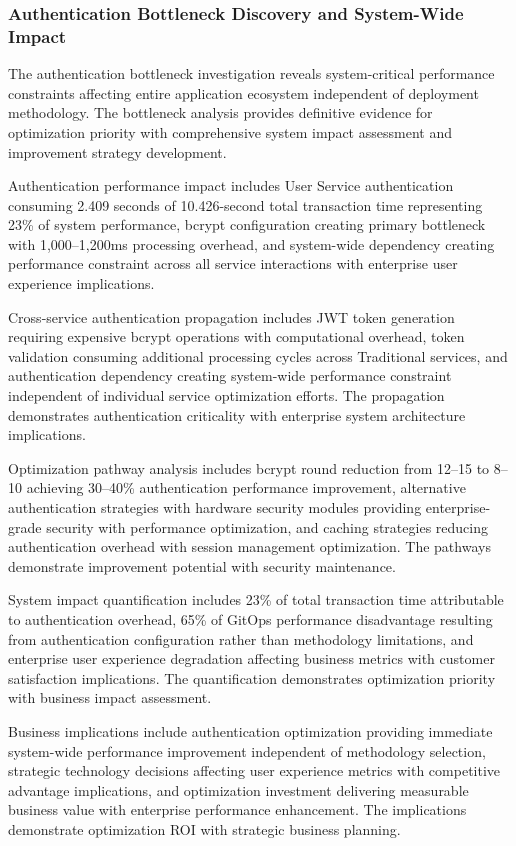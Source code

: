 \subsubsection{Authentication Bottleneck Discovery and System-Wide Impact}

The authentication bottleneck investigation reveals system-critical performance constraints affecting entire application ecosystem independent of deployment methodology. The bottleneck analysis provides definitive evidence for optimization priority with comprehensive system impact assessment and improvement strategy development.

Authentication performance impact includes User Service authentication consuming 2.409 seconds of 10.426-second total transaction time representing 23\% of system performance, bcrypt configuration creating primary bottleneck with 1,000--1,200ms processing overhead, and system-wide dependency creating performance constraint across all service interactions with enterprise user experience implications.

Cross-service authentication propagation includes JWT token generation requiring expensive bcrypt operations with computational overhead, token validation consuming additional processing cycles across Traditional services, and authentication dependency creating system-wide performance constraint independent of individual service optimization efforts. The propagation demonstrates authentication criticality with enterprise system architecture implications.

Optimization pathway analysis includes bcrypt round reduction from 12--15 to 8--10 achieving 30--40\% authentication performance improvement, alternative authentication strategies with hardware security modules providing enterprise-grade security with performance optimization, and caching strategies reducing authentication overhead with session management optimization. The pathways demonstrate improvement potential with security maintenance.

System impact quantification includes 23\% of total transaction time attributable to authentication overhead, 65\% of GitOps performance disadvantage resulting from authentication configuration rather than methodology limitations, and enterprise user experience degradation affecting business metrics with customer satisfaction implications. The quantification demonstrates optimization priority with business impact assessment.

Business implications include authentication optimization providing immediate system-wide performance improvement independent of methodology selection, strategic technology decisions affecting user experience metrics with competitive advantage implications, and optimization investment delivering measurable business value with enterprise performance enhancement. The implications demonstrate optimization ROI with strategic business planning.

